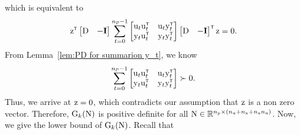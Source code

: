 which is equivalent to
\begin{equation}
    \begin{split}
    \vcz^\tr
    \begin{bmatrix}\mxD & -\mathbf{I}\end{bmatrix}
    \sum_{t=0}^{\nD-1}
    \begin{bmatrix} 
        \vcu_t\vcu_t^\tr & \vcu_t\vcy_t^\tr\\
        \vcy_t\vcu_t^\tr & \vcy_t\vcy_t^\tr
    \end{bmatrix} 
    \begin{bmatrix}\mxD & -\mathbf{I}\end{bmatrix}^\tr
    \vcz  = 0. \\
    \end{split}
\end{equation}
From Lemma~\ref{lem:PD for summarion y_t}, we know
\begin{align}
  \sum_{t=0}^{\nD-1}
    \begin{bmatrix} 
        \vcu_t\vcu_t^\tr & \vcu_t\vcy_t^\tr\\
        \vcy_t\vcu_t^\tr & \vcy_t\vcy_t^\tr
    \end{bmatrix} \succ 0.  
\end{align}
Thus, we arrive at ${ \mathrm{z} } = 0$, which contradicts our assumption that ${ \mathrm{z} }$ is a non zero vector. Therefore, ${ \mathrm{G} }_k({ \mathrm{N} })$ is positive definite for all ${ \mathrm{N} } \in {\mathbb{R}}^{n_{ \mathrm{y} } \times (n_{ \mathrm{u} } + n_{ \mathrm{x} } + n_{ \mathrm{x} }n_{ \mathrm{u} })}$. Now, we give the lower bound of ${ \mathrm{G} }_k({ \mathrm{N} })$. Recall that
